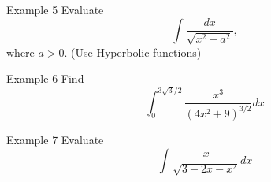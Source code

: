 \documentclass{beamer}
\begin{document}
\begin{frame}{Example 5}
    Evaluate \[\int \dfrac{dx}{\sqrt{x^2-a^2}},\] where \(a>0\). (Use Hyperbolic functions)
    
\end{frame}

\begin{frame}{Example 6}
    Find \[\int_{0}^{3\sqrt{3}/2}\dfrac{x^3}{(4x^2+9)^{3/2}}dx\]
\end{frame}

\begin{frame}{Example 7}
    Evaluate \[\int \dfrac{x}{\sqrt{3-2x-x^2}}dx\]
\end{frame}
\end{document}
